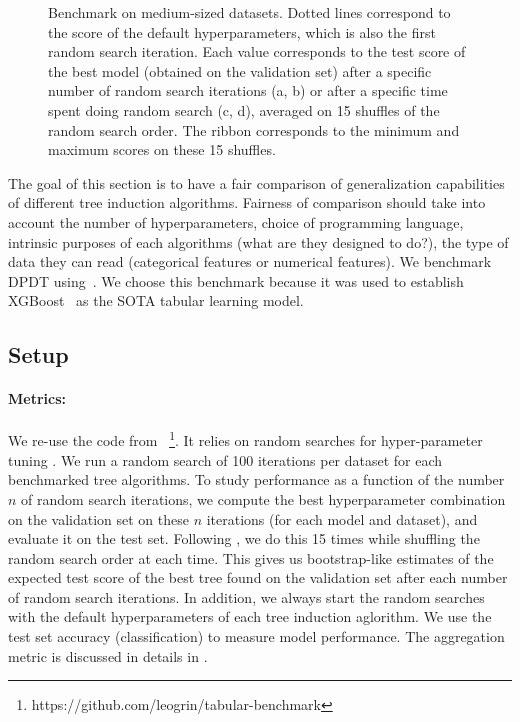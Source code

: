 \begin{figure}
\begin{minipage}{0.24\textwidth}
        \label{fig:classif-cat-all}
    \end{minipage}
\caption{Benchmark on medium-sized datasets. Dotted lines correspond to the score of the default hyperparameters, which is also the first random search iteration. Each value corresponds to the test score of the best model (obtained on the validation set) after a specific number of random search iterations (a, b) or after a specific time spent doing random search (c, d), averaged on 15 shuffles of the random search order. The ribbon corresponds to the minimum and maximum scores on these 15 shuffles.}\label{fig:gen-classif}
\end{figure}

The goal of this section is to have a fair comparison of generalization capabilities of different tree induction algorithms. Fairness of comparison should take into account the number of hyperparameters, choice of programming language, intrinsic purposes of each algorithms (what are they designed to do?), the type of data they can read (categorical features or numerical features). We benchmark DPDT using~\cite{grinsztajn2022tree}. We choose this benchmark because it was used to establish XGBoost~\cite{xgb} as the SOTA tabular learning model. 

\subsection{Setup}

\paragraph{Metrics:} We re-use the code from \cite{grinsztajn2022tree}~\footnote{https://github.com/leogrin/tabular-benchmark}. It relies on random searches for hyper-parameter tuning \cite{pmlr-v28-bergstra13}. We run a random search of 100 iterations per dataset for each benchmarked tree algorithms. To study performance as a function of the number $n$ of random search iterations, we compute the best hyperparameter combination on the validation set on these $n$ iterations (for each model and dataset), and evaluate it on the test set. Following \cite{grinsztajn2022tree}, we do this 15 times while shuffling the random search order at each time. This gives us bootstrap-like estimates of the expected test score of the best tree found on the validation set after each number of random search iterations. In addition, we always start the random searches with the default hyperparameters of each tree induction aglorithm. We use the test set accuracy (classification) to measure model performance. The aggregation metric is discussed in details in \cite[Section 3]{grinsztajn2022tree}.

